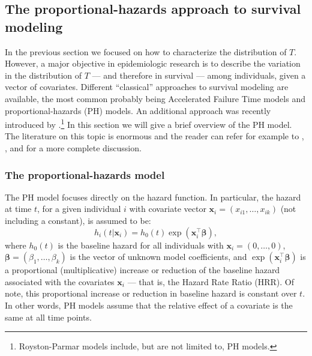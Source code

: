 \subsection{The proportional-hazards approach to survival modeling}
\label{sec:phapproach}

In the previous section we focused on how to characterize the distribution of $T$. However, a major objective in epidemiologic research is to describe the variation in the distribution of $T$ --- and therefore in survival --- among individuals, given a vector of covariates. Different ``classical'' approaches to survival modeling are available, the most common probably being Accelerated Failure Time models and proportional-hazards (PH) models. An additional  approach was recently introduced by \citet{royston_flexible_2002}.\footnote{Royston-Parmar models include, but are not limited to, PH models.} In this section we will give a brief overview of the PH model. The literature on this topic is enormous and the reader can refer for example to \citet{therneau_modeling_2000}, \citet{kalbfleisch_statistical_2002}, and \citet{vanhouwelingen_cox_2013} for a more complete discussion.

\subsubsection{The proportional-hazards model}
The PH model focuses directly on the hazard function. In particular, the hazard at time $t$, for a given individual $i$ with covariate vector $\mathbf{x}_i=(x_{i1},\ldots,x_{ik})$ (not including a constant), is assumed to be:
\begin{equation}
h_i(t|\mathbf{x}_i) = h_0(t)\exp\left(\mathbf{x}_i^\top\boldsymbol{\beta}\right),
\label{eq:phmodels}
\end{equation}
where $ h_0(t)$ is the baseline hazard for all individuals with $\mathbf{x}_i = \left(0,\ldots,0\right)$, $\boldsymbol{\beta} = \left( \beta_1,\ldots,\beta_k \right)$ is the vector of unknown model coefficients, and $\exp\left(\mathbf{x}_i^\top\boldsymbol{\beta}\right)$ is a proportional (multiplicative) increase or reduction of the baseline hazard associated with the covariates $\mathbf{x}_i$ --- that is, the Hazard Rate Ratio (HRR). Of note, this proportional increase or reduction in baseline hazard is constant over $t$. In other words, PH models assume that the relative effect of a covariate is the same at all time points.

